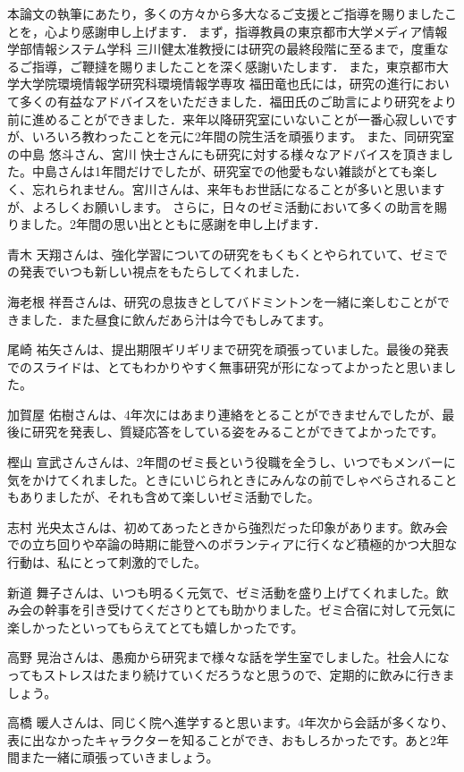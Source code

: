 本論文の執筆にあたり，多くの方々から多大なるご支援とご指導を賜りましたことを，心より感謝申し上げます．
まず，指導教員の東京都市大学メディア情報学部情報システム学科 三川健太准教授には研究の最終段階に至るまで，度重なるご指導，ご鞭撻を賜りましたことを深く感謝いたします．
また，東京都市大学大学院環境情報学研究科環境情報学専攻 福田竜也氏には，研究の進行において多くの有益なアドバイスをいただきました．福田氏のご助言により研究をより前に進めることができました．来年以降研究室にいないことが一番心寂しいですが、いろいろ教わったことを元に2年間の院生活を頑張ります。
また、同研究室の中島 悠斗さん、宮川 快士さんにも研究に対する様々なアドバイスを頂きました。中島さんは1年間だけでしたが、研究室での他愛もない雑談がとても楽しく、忘れられません。宮川さんは、来年もお世話になることが多いと思いますが、よろしくお願いします。
さらに，日々のゼミ活動において多くの助言を賜りました。2年間の思い出とともに感謝を申し上げます．

青木 天翔さんは、強化学習についての研究をもくもくとやられていて、ゼミでの発表でいつも新しい視点をもたらしてくれました．

海老根 祥吾さんは、研究の息抜きとしてバドミントンを一緒に楽しむことができました．また昼食に飲んだあら汁は今でもしみてます。

尾崎 祐矢さんは、提出期限ギリギリまで研究を頑張っていました。最後の発表でのスライドは、とてもわかりやすく無事研究が形になってよかったと思いました。

加賀屋 佑樹さんは、4年次にはあまり連絡をとることができませんでしたが、最後に研究を発表し、質疑応答をしている姿をみることができてよかったです。

樫山 宣武さんさんは、2年間のゼミ長という役職を全うし、いつでもメンバーに気をかけてくれました。ときにいじられときにみんなの前でしゃべらされることもありましたが、それも含めて楽しいゼミ活動でした。

志村 光央太さんは、初めてあったときから強烈だった印象があります。飲み会での立ち回りや卒論の時期に能登へのボランティアに行くなど積極的かつ大胆な行動は、私にとって刺激的でした。

新道 舞子さんは、いつも明るく元気で、ゼミ活動を盛り上げてくれました。飲み会の幹事を引き受けてくださりとても助かりました。ゼミ合宿に対して元気に楽しかったといってもらえてとても嬉しかったです。

高野 晃治さんは、愚痴から研究まで様々な話を学生室でしました。社会人になってもストレスはたまり続けていくだろうなと思うので、定期的に飲みに行きましょう。

高橋 暖人さんは、同じく院へ進学すると思います。4年次から会話が多くなり、表に出なかったキャラクターを知ることができ、おもしろかったです。あと2年間また一緒に頑張っていきましょう。

